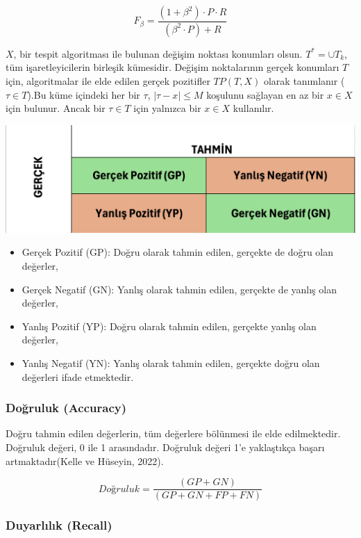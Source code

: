 \documentclass[12pt,twoside]{deuthesis}
\providecommand{\tightlist}{%
  \setlength{\itemsep}{0pt}\setlength{\parskip}{0pt}}
\begin{document}
\[F_{\beta} = \frac{(1 + \beta^2) \cdot P \cdot R}{(\beta^2 \cdot P) + R}\]

\(X\), bir tespit algoritması ile bulunan değişim noktası konumları olsun. \(T^* = \cup T_k\), tüm işaretleyicilerin birleşik kümesidir. Değişim noktalarının gerçek konumları \(T\) için, algoritmalar ile elde edilen gerçek pozitifler \(TP(T, X)\) olarak tanımlanır (\(\tau \in T\)).Bu küme içindeki her bir \(\tau\), \(|\tau - x| \leq M\) koşulunu sağlayan en az bir \(x \in X\) için bulunur. Ancak bir \(\tau \in T\) için yalnızca bir \(x \in X\) kullanılır.

\includegraphics[width=19.22in]{figure/conmat}

\begin{itemize}
\tightlist
\item
  Gerçek Pozitif (GP): Doğru olarak tahmin edilen, gerçekte de doğru olan değerler,
\item
  Gerçek Negatif (GN): Yanlış olarak tahmin edilen, gerçekte de yanlış olan değerler,
\item
  Yanlış Pozitif (YP): Doğru olarak tahmin edilen, gerçekte yanlış olan değerler,
\item
  Yanlış Negatif (YN): Yanlış olarak tahmin edilen, gerçekte doğru olan değerleri ifade etmektedir.
\end{itemize}

\hypertarget{doux11fruluk-accuracy}{%
\subsubsection{Doğruluk (Accuracy)}\label{doux11fruluk-accuracy}}

Doğru tahmin edilen değerlerin, tüm değerlere bölünmesi ile elde edilmektedir. Doğruluk değeri, 0 ile 1 arasındadır. Doğruluk değeri 1'e yaklaştıkça başarı artmaktadır(Kelle ve Hüseyin, 2022).

\[Doğruluk = \frac{(GP + GN)}{(GP + GN + FP + FN)}\]

\hypertarget{duyarlux131lux131k-recall}{%
\subsubsection{Duyarlılık (Recall)}\label{duyarlux131lux131k-recall}}
\end{document}

